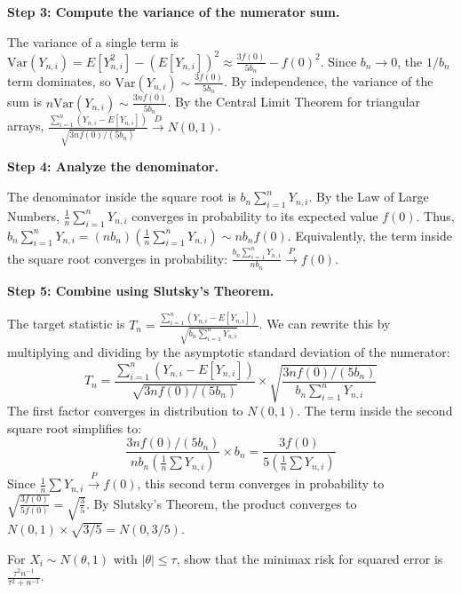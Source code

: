 \begin{solution}
\textbf{Step 3: Compute the variance of the numerator sum.}

The variance of a single term is $\text{Var}(Y_{n,i}) = E[Y_{n,i}^2] - (E[Y_{n,i}])^2 \approx \frac{3f(0)}{5b_n} - f(0)^2$.
Since $b_n \to 0$, the $1/b_n$ term dominates, so $\text{Var}(Y_{n,i}) \sim \frac{3f(0)}{5b_n}$.
By independence, the variance of the sum is $n \text{Var}(Y_{n,i}) \sim \frac{3n f(0)}{5b_n}$.
By the Central Limit Theorem for triangular arrays, $\frac{\sum_{i=1}^n (Y_{n,i} - E[Y_{n,i}])}{\sqrt{3nf(0) / (5b_n)}} \xrightarrow{D} N(0, 1)$.

\textbf{Step 4: Analyze the denominator.}

The denominator inside the square root is $b_n \sum_{i=1}^n Y_{n,i}$. 
By the Law of Large Numbers, $\frac{1}{n} \sum_{i=1}^n Y_{n,i}$ converges in probability to its expected value $f(0)$.
Thus, $b_n \sum_{i=1}^n Y_{n,i} = (n b_n) \left(\frac{1}{n} \sum_{i=1}^n Y_{n,i}\right) \sim n b_n f(0)$.
Equivalently, the term inside the square root converges in probability: $\frac{b_n \sum_{i=1}^n Y_{n,i}}{n b_n} \xrightarrow{P} f(0)$.

\textbf{Step 5: Combine using Slutsky's Theorem.}

The target statistic is $T_n = \frac{\sum_{i=1}^n (Y_{n,i} - E[Y_{n,i}])}{\sqrt{b_n \sum_{i=1}^n Y_{n,i}}}$.
We can rewrite this by multiplying and dividing by the asymptotic standard deviation of the numerator:
\[ T_n = \frac{\sum_{i=1}^n (Y_{n,i} - E[Y_{n,i}])}{\sqrt{3nf(0) / (5b_n)}} \times \sqrt{ \frac{3nf(0) / (5b_n)}{b_n \sum_{i=1}^n Y_{n,i}} } \]
The first factor converges in distribution to $N(0, 1)$. 
The term inside the second square root simplifies to:
\[ \frac{3nf(0) / (5b_n)}{n b_n \left( \frac{1}{n} \sum Y_{n,i} \right)} \times b_n = \frac{3f(0)}{5 \left( \frac{1}{n} \sum Y_{n,i} \right)} \]
Since $\frac{1}{n} \sum Y_{n,i} \xrightarrow{P} f(0)$, this second term converges in probability to $\sqrt{\frac{3f(0)}{5f(0)}} = \sqrt{\frac{3}{5}}$.
By Slutsky's Theorem, the product converges to $N(0, 1) \times \sqrt{3/5} = N(0, 3/5)$.
\end{solution}

\begin{exercise}\label{probability:2010:9}
For $X_i \sim N(\theta, 1)$ with $|\theta| \leq \tau$, show that the minimax risk for squared error is $\frac{\tau^2 n^{-1}}{\tau^2 + n^{-1}}$.
\end{exercise}

